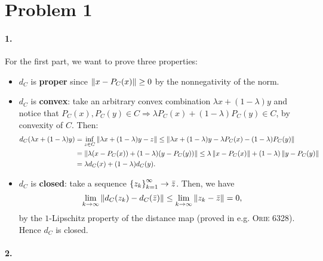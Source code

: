 \documentclass[10pt]{article}
\begin{document}
\allowdisplaybreaks
\everymath{\displaystyle}


\section*{Problem 1}
\paragraph{1.}
For the first part, we want to prove three properties:
\begin{itemize}
\item $d_{C}$ is \textbf{proper} since $\left \| x - P_C(x) \right \| \geq 0$ by the
nonnegativity of the norm.
\item $d_{C}$ is \textbf{convex}: take an arbitrary convex combination $
\lambda x + (1 - \lambda) y$ and notice that $P_C(x), P_C(y) \in C \Rightarrow
\lambda P_C(x) + (1 - \lambda) P_C(y) \in C$, by convexity of $C$. Then:
\begin{align*}
    d_C(\lambda x + (1 - \lambda)y) &= \inf_{z \in C}
    \left \| \lambda x + (1 - \lambda) y - z \right \| \leq
    \left \| \lambda x + (1 - \lambda) y - \lambda P_C(x) - (1 - \lambda) P_C(y) \right \|
    \\
    &= \left \| \lambda(x  - P_C(x)) + (1 - \lambda)(y - P_C(y)) \right \| \leq
       \lambda \left \| x - P_C(x) \right \| + (1 - \lambda) \left \| y - P_C(y) \right \| \\
    &=   \lambda d_C(x) + (1 - \lambda) d_C(y).
\end{align*}
\item $d_C$ is \textbf{closed}: take a sequence
$\left\{ z_k \right\}_{k=1}^{\infty} \to \bar{z}$. Then, we have
\[
    \lim_{k \to \infty} \left \| d_C(z_k) - d_C(\bar{z}) \right \| \leq
    \lim_{k \to \infty} \left \| z_k - \bar{z} \right \| = 0,
\]
by the $1$-Lipschitz property of the distance map (proved in e.g. \textsc{Orie
6328}). Hence $d_C$ is closed.
\end{itemize}

\paragraph{2.}
\end{document}
